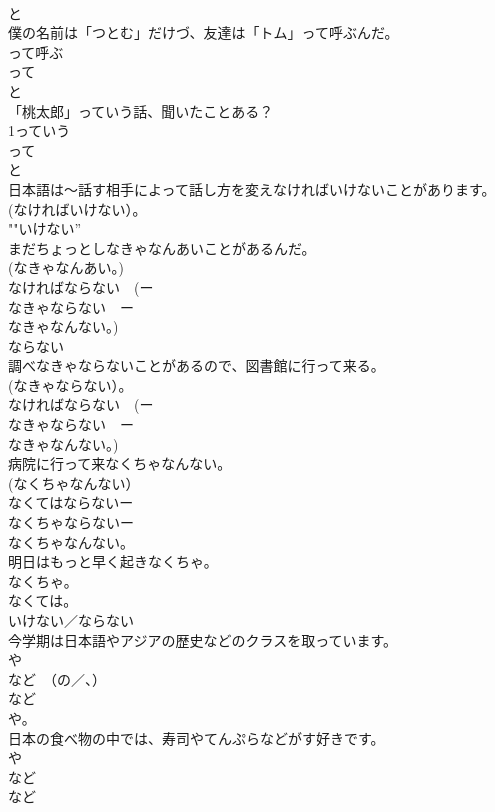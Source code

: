 \documentclass[8pt]{extreport}
\begin{document}
\begin{CJK}{UTF8}{min}
\\	と
\\	僕の名前は「つとむ」だけづ、友達は「トム」って呼ぶんだ。	
\\	って呼ぶ 
\\	って 
\\	と
\\	「桃太郎」っていう話、聞いたことある？	
\\	1っていう
\\	って 
\\	と
\\	日本語は〜話す相手によって話し方を変えなければいけないことがあります。	
\\	(なければいけない）。 　
\\	""いけない”　 
\\	まだちょっとしなきゃなんあいことがあるんだ。	
\\	(なきゃなんあい。) 
\\	なければならない　(ー
\\	なきゃならない　ー
\\	なきゃなんない。) 
\\	ならない 
\\	調べなきゃならないことがあるので、図書館に行って来る。	
\\	(なきゃならない）。 
\\	なければならない　(ー
\\	なきゃならない　ー
\\	なきゃなんない。)
\\	病院に行って来なくちゃなんない。	
\\	(なくちゃなんない） 
\\	なくてはならないー
\\	なくちゃならないー
\\	なくちゃなんない。
\\	明日はもっと早く起きなくちゃ。	
\\	なくちゃ。 
\\	なくては。 
\\	いけない／ならない　
\\	今学期は日本語やアジアの歴史などのクラスを取っています。	
\\	や　
\\	など　（の／、）
\\	など 
\\	や。 
\\	日本の食べ物の中では、寿司やてんぷらなどがす好きです。	
\\	や　
\\	など 
\\	など 

\end{CJK}
\end{document}
